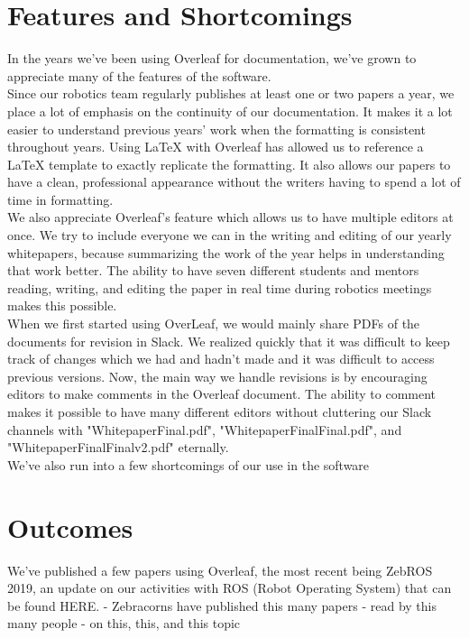 \documentclass{zebracorns}
\begin{document}
\section{Features and Shortcomings}
In the years we've been using Overleaf for documentation, we've grown to appreciate many of the features of the software. \\

Since our robotics team regularly publishes at least one or two papers a year, we place a lot of emphasis on the continuity of our documentation. It makes it a lot easier to understand previous years' work when the formatting is consistent throughout years. Using LaTeX with Overleaf has allowed us to reference a LaTeX template to exactly replicate the formatting. It also allows our papers to have a clean, professional appearance without the writers having to spend a lot of time in formatting.\\

We also appreciate Overleaf's feature which allows us to have multiple editors at once. We try to include everyone we can in the writing and editing of our yearly whitepapers, because summarizing the work of the year helps in understanding that work better. The ability to have seven different students and mentors reading, writing, and editing the paper in real time during robotics meetings makes this possible. \\

When we first started using OverLeaf, we would mainly share PDFs of the documents for revision in Slack. We realized quickly that it was difficult to keep track of changes which we had and hadn't made and it was difficult to access previous versions. Now, the main way we handle revisions is by encouraging editors to make comments in the Overleaf document. The ability to comment makes it possible to have many different editors without cluttering our Slack channels with "WhitepaperFinal.pdf", "WhitepaperFinalFinal.pdf", and "WhitepaperFinalFinalv2.pdf" eternally.\\

We've also run into a few shortcomings of our use in the software 

%
%

\section{Outcomes}
We've published a few papers using Overleaf, the most recent being ZebROS 2019, an update on our activities with ROS (Robot Operating System) that can be found HERE.
 - Zebracorns have published this many papers
 - read by this many people
 - on this, this, and this topic
\end{document}
